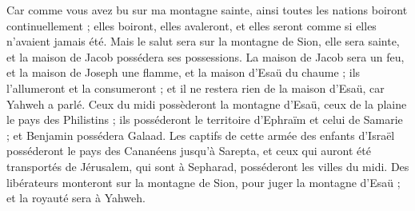 \begin{multicols}{2}
Car comme vous avez bu sur ma montagne sainte, ainsi toutes les nations boiront continuellement ; elles boiront, elles avaleront, et elles seront comme si elles n'avaient jamais été.
Mais le salut sera sur la montagne de Sion, elle sera sainte, et la maison de Jacob possédera ses possessions.
La maison de Jacob sera un feu, et la maison de Joseph une flamme, et la maison d'Esaü du chaume ; ils l'allumeront et la consumeront ; et il ne restera rien de la maison d'Esaü, car Yahweh a parlé.
Ceux du midi possèderont la montagne d'Esaü, ceux de la plaine le pays des Philistins ; ils posséderont le territoire d'Ephraïm et celui de Samarie ; et Benjamin possédera Galaad.
Les captifs de cette armée des enfants d'Israël posséderont le pays des Cananéens jusqu'à Sarepta, et ceux qui auront été transportés de Jérusalem, qui sont à Sepharad, posséderont les villes du midi.
Des libérateurs monteront sur la montagne de Sion, pour juger la montagne d'Esaü ; et la royauté sera à Yahweh.
\PPE{}
\end{multicols}
